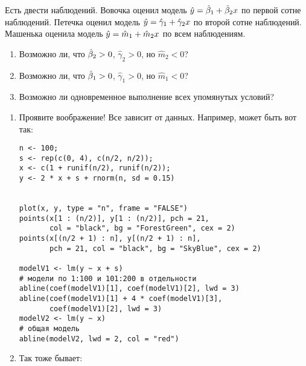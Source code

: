 \begin{problem} %
Есть двести наблюдений. Вовочка оценил модель $\hy=\hb_1+\hb_2 x$ по первой сотне наблюдений. Петечка оценил модель $\hy=\hat{\gamma}_1+\hat{\gamma}_2 x$ по второй сотне наблюдений. Машенька оценила модель $\hy=\hat{m}_1+\hat{m}_2 x$ по всем наблюдениям.
\begin{enumerate}
\item Возможно ли, что $\hb_2>0$, $\hat{\gamma}_2>0$, но $\hat{m}_2<0$?
\item Возможно ли, что $\hb_1>0$, $\hat{\gamma}_1>0$, но $\hat{m}_1<0$?
\item Возможно ли одновременное выполнение всех упомянутых условий?
\end{enumerate}


\begin{sol}
\begin{enumerate}
\item Проявите воображение! Все зависит от данных. Например, может быть вот так:

\begin{verbatim}
n <- 100;
s <- rep(c(0, 4), c(n/2, n/2));
x <- c(1 + runif(n/2), runif(n/2));
y <- 2 * x + s + rnorm(n, sd = 0.15)


plot(x, y, type = "n", frame = "FALSE")
points(x[1 : (n/2)], y[1 : (n/2)], pch = 21,
       col = "black", bg = "ForestGreen", cex = 2)
points(x[(n/2 + 1) : n], y[(n/2 + 1) : n],
       pch = 21, col = "black", bg = "SkyBlue", cex = 2)

modelV1 <- lm(y ~ x + s)
# модели по 1:100 и 101:200 в отдельности
abline(coef(modelV1)[1], coef(modelV1)[2], lwd = 3)
abline(coef(modelV1)[1] + 4 * coef(modelV1)[3],
       coef(modelV1)[2], lwd = 3)
modelV2 <- lm(y ~ x)
# общая модель
abline(modelV2, lwd = 2, col = "red")
\end{verbatim}

\begin{minipage}{0.6\textwidth}
\begin{center}
\begin{tikzpicture}[scale = 0.025]

\end{tikzpicture}
\end{center}
\end{minipage}


\item Так тоже бывает:


\end{enumerate}
\end{sol}
\end{problem}
